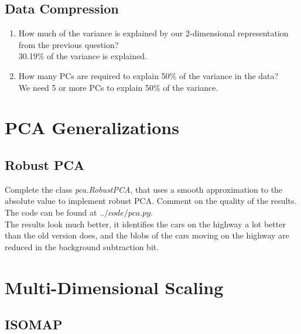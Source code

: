 \documentclass{article}
\def\blu#1{{\color{blu}#1}}
\def\gre#1{{\color{gre}#1}}
\def\enum#1{\begin{enumerate}#1\end{enumerate}}
\begin{document}
\subsection{Data Compression}

\blu{\enum{
\item How much of the variance is explained by our 2-dimensional representation from the previous question?
\\
\gre{
30.19\% of the variance is explained.
}
\item How many PCs are required to explain 50\% of the variance in the data?
\\
\gre{
We need 5 or more PCs to explain 50\% of the variance.
}
}}

\section{PCA Generalizations}

\subsection{Robust PCA}

\blu{Complete the class \emph{pca.RobustPCA},
that uses a smooth approximation to the absolute value to implement robust PCA. Comment on the quality of the results.}
\\
\gre{
The code can be found at $../code/pca.py$.
\\
The results look much better, it identifies the cars on the highway a lot better than the old version does, and the blobs of the cars moving on the highway are reduced in the background subtraction bit.
}
\section{Multi-Dimensional Scaling}

\subsection{ISOMAP}
\end{document}
